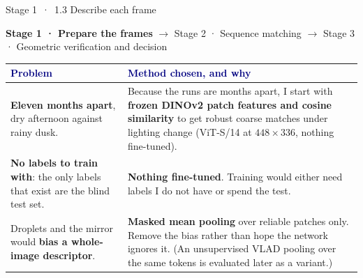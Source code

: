 \documentclass[10pt,aspectratio=169]{beamer}
\begin{document}
\begin{frame}{Stage 1 \,·\, 1.3 Describe each frame}
\vspace{-5pt}
\begin{center}\end{center}
\vspace{-9pt}\begin{center}\tiny \textbf{Stage 1 · Prepare the frames} $\rightarrow$ \textcolor{navy!55}{Stage 2 · Sequence matching} $\rightarrow$ \textcolor{navy!55}{Stage 3 · Geometric verification and decision}\end{center}
\vspace{-3pt}
\footnotesize\setlength{\tabcolsep}{5pt}\renewcommand{\arraystretch}{1.05}
\begin{tabularx}{\textwidth}{@{}>{\raggedright\arraybackslash}p{}>{\raggedright\arraybackslash}X@{}}
\toprule \textcolor{navy}{\textbf{Problem}} & \textcolor{navy}{\textbf{Method chosen, and why}} \\ \midrule
\textbf{Eleven months apart}, dry afternoon against rainy dusk. & Because the runs are months apart, I start with \textbf{frozen DINOv2 patch features and cosine similarity} to get robust coarse matches under lighting change (ViT-S/14 at $448\times336$, nothing fine-tuned). \\
\addlinespace[3pt]
\textbf{No labels to train with}: the only labels that exist are the blind test set. & \textbf{Nothing fine-tuned}. Training would either need labels I do not have or spend the test. \\
\addlinespace[3pt]
Droplets and the mirror would \textbf{bias a whole-image descriptor}. & \textbf{Masked mean pooling} over reliable patches only. Remove the bias rather than hope the network ignores it. (An unsupervised VLAD pooling over the same tokens is evaluated later as a variant.) \\
\bottomrule\end{tabularx}
\end{frame}
\end{document}
